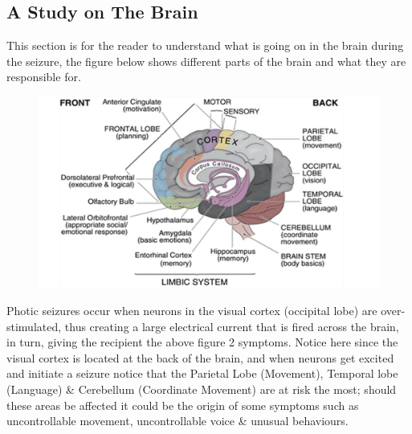 \documentclass[twocolumn, 10pt, conference]{ieeetran}
\begin{document}
\subsection{A Study on The Brain}
This section is for the reader to understand what is going on in the brain during the seizure, the figure below shows different parts of the brain and what they are responsible for.
\begin{figure}[h]
	\centering
	\includegraphics[width=1\linewidth]{a7c4617a0cd51b6a39119417ae3cd24e}
	\caption{}
	\label{fig:Brain Described}\cite{BrainUnderstand}
\end{figure}
Photic seizures occur when neurons in the visual cortex (occipital lobe) are over-stimulated, thus creating a large electrical current that is fired across the brain, in turn, giving the recipient the above figure 2 symptoms. Notice here since the visual cortex is located at the back of the brain, and when neurons get excited and initiate a seizure notice that the Parietal Lobe (Movement), Temporal lobe (Language) \& Cerebellum (Coordinate Movement) are at risk the most; should these areas be affected it could be the origin of some symptoms such as uncontrollable movement, uncontrollable voice \& unusual behaviours.
\end{document}
